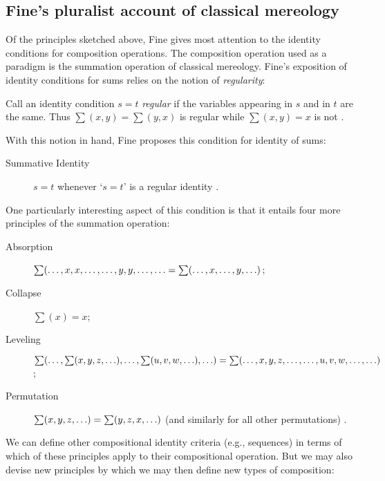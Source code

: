 \documentclass[12pt,twoside]{reedfancy}
\newenvironment{squote}{%
	\begin{spacing}{1}
	\begin{list}{}{%
	\setlength{\labelwidth}{0pt}%
	\rightmargin\leftmargin%
	}
	\item\relax
	}{%
	\end{list}%
	\end{spacing}
	}
\begin{document}
\begin{spacing}{1.25}
\subsection{Fine's pluralist account of classical mereology}
\label{classical}
Of the principles sketched above, Fine gives most attention to the
identity conditions for composition operations.  The composition
operation used as a paradigm is the summation operation of classical
mereology.  Fine's exposition of identity conditions for sums relies
on the notion of {\em regularity}:

\begin{squote}
Call an identity condition $s = t$ {\em regular} if the variables
appearing in $s$ and in $t$ are the same.  Thus $\sum (x, y) = \sum
(y, x)$ is regular while $\sum (x, y) = x$ is not
\citeyearpar[572]{fine2010}.
\end{squote}

With this notion in hand, Fine proposes this condition for identity of
sums:

\begin{description}
  \item[Summative Identity] $s = t$ whenever `$s = t$' is a regular
    identity \citeyearpar[572]{fine2010}.
\end{description}

One particularly interesting aspect of this condition is that it
entails four more principles of the summation operation:

\begin{description}
  \item[Absorption] $\sum (\mathellipsis, x, x, \mathellipsis,
    \mathellipsis, y, y, \mathellipsis, \mathellipsis = \sum (
    \mathellipsis, x, \mathellipsis, y, \mathellipsis )$;
\item[Collapse] $\sum (x) = x$;
\item[Leveling] $\sum (\mathellipsis, \sum (x, y, z, \mathellipsis ),
  \mathellipsis, \sum (u, v, w, \mathellipsis ), \mathellipsis ) \\ =
  \sum (\mathellipsis, x, y, z, \mathellipsis, \mathellipsis, u, v, w,
  \mathellipsis, \mathellipsis )$;
\item[Permutation] $\sum (x, y, z, \mathellipsis ) = \sum (y, z, x,
  \mathellipsis )$ (and similarly for all other permutations)
  \citep[573]{fine2010}.
\end{description}

We can define other compositional identity criteria (e.g., sequences)
in terms of which of these principles apply to their compositional
operation.  But we may also devise new principles by which we may then
define new types of composition:


\end{spacing}
\end{document}
